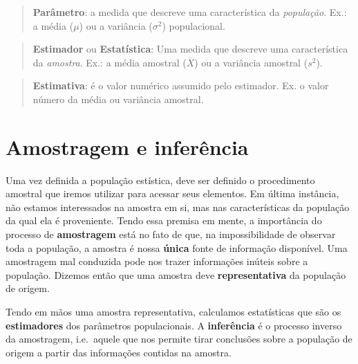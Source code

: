 \documentclass[
]{book}
\begin{document}
\begin{quote}
\textbf{Parâmetro}: a medida que descreve uma característica da \textit{população}. Ex.: a média (\(\mu\)) ou a variância (\(\sigma^2\)) populacional.
\end{quote}

\begin{quote}
\textbf{Estimador} ou \textbf{Estatística}: Uma medida que descreve uma característica da \textit{amostra}. Ex.: a média amostral (\(\overline{X}\)) ou a variância amostral (\(s^2\)).
\end{quote}

\begin{quote}
\textbf{Estimativa}: é o valor numérico assumido pelo estimador. Ex. o valor número da média ou variância amostral.
\end{quote}

\hypertarget{amostragem-e-inferuxeancia}{%
\section{Amostragem e inferência}\label{amostragem-e-inferuxeancia}}

Uma vez definida a população estística, deve ser definido o procedimento amostral que iremos utilizar para acessar seus elementos. Em última instância, não estamos interessados na amostra em si, mas nas características da população da qual ela é proveniente. Tendo essa premisa em mente, a importância do processo de \textbf{amostragem} está no fato de que, na impossibilidade de observar toda a população, a amostra é nossa \textbf{única} fonte de informação disponível. Uma amostragem mal conduzida pode nos trazer informações inúteis sobre a população. Dizemos então que uma amostra deve \textbf{representativa} da população de origem.

Tendo em mãos uma amostra representativa, calculamos estatísticas que são os \textbf{estimadores} dos parâmetros populacionais. A \textbf{inferência} é o processo inverso da amostragem, i.e.~aquele que nos permite tirar conclusões sobre a população de origem a partir das informações contidas na amostra.
\end{document}
